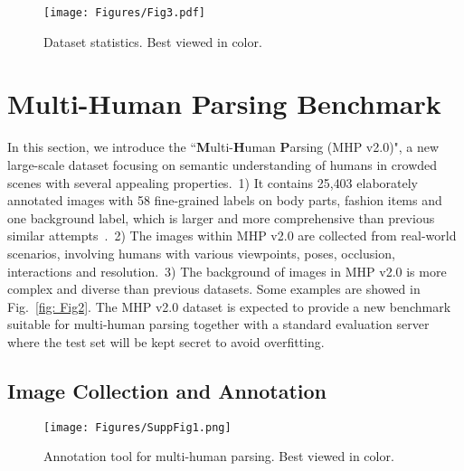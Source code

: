 \documentclass[10pt,twocolumn,letterpaper]{article}
\theoremstyle{definition}
\theoremstyle{remark}
\begin{document}
\begin{figure*}[t]
	\begin{center}
		\texttt{[image: Figures/Fig3.pdf]}
	\end{center}
	\vspace{-4mm}
	\small
	\caption{\small Dataset statistics. Best viewed in color.}
	\label{fig: Fig3}
\end{figure*}

\section{Multi-Human Parsing Benchmark}
\label{Multi-Human Parsing Benchmark}

In this section, we introduce the ``\textbf{M}ulti-\textbf{H}uman \textbf{P}arsing (MHP v2.0)", a new large-scale dataset focusing on semantic understanding of humans in crowded scenes with several appealing properties.~1) It contains 25{,}403 elaborately annotated images with 58 fine-grained labels on body parts, fashion items and one background label, which is larger and more comprehensive than previous similar attempts~\cite{vineet2011human, li2017towards}.~2) The images within MHP v2.0 are collected from real-world scenarios, involving humans with various viewpoints, poses, occlusion,  interactions and resolution.~3) The background of images in MHP v2.0 is more complex and diverse than previous datasets. Some examples are showed in Fig.~\ref{fig: Fig2}. The MHP v2.0 dataset is expected to provide a new benchmark suitable for multi-human parsing together with a standard evaluation server where the test set will be kept secret to avoid overfitting.

\subsection{Image Collection and Annotation} 

\begin{figure}[t]
	\begin{center}
		\texttt{[image: Figures/SuppFig1.png]}
	\end{center}
	\vspace{-4mm}
	\small
	\caption{\small Annotation tool for multi-human parsing. Best viewed in color.}
	\label{fig: Fig3_1}
	\vspace{-3mm}
\end{figure}
\end{document}
